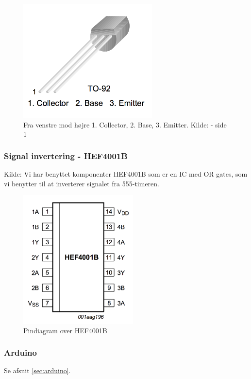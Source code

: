 \begin{figure}[H]
	\centering
    \includegraphics[width=7cm]{figures/2_4_4hastighedsmaal/kompNPNtransistor.png}
	\caption{Fra venstre mod højre 1. Collector, 2. Base, 3. Emitter. Kilde:\cite{NPNtransistorKomp} - side 1}
	\label{fig:npntransistor}
\end{figure}



\subsubsection{Signal invertering - HEF4001B}
Kilde: \cite{kompInverter}
Vi har benyttet komponenter HEF4001B som er en IC med OR gates, som vi benytter til at inverterer signalet fra 555-timeren.



\begin{figure}[H]
	\centering
    \includegraphics[height=7cm]{figures/2_4_4hastighedsmaal/kompInverterpin.png}
	\caption{Pindiagram over HEF4001B}
	\label{fig:kompInverter}
\end{figure}


\subsubsection{Arduino}
Se afsnit \ref{sec:arduino}.

